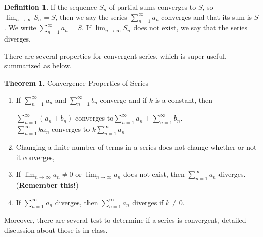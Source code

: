 \documentclass[12pt]{article}
\theoremstyle{definition}
\newtheorem{thm}{Theorem}[section]
\theoremstyle{definition}
\newtheorem{definition}{Definition}[section]
\theoremstyle{remark}
\theoremstyle{definition}
\theoremstyle{definition}
\theoremstyle{definition}
\begin{document}
\begin{definition}
If the sequence $S_n$ of partial sums converges to $S$, so $\lim_{n \to \infty}S_n = S$, then we say the series
$\sum_{n=1}^{\infty} a_n$ converges and that its sum is $S$. We write
$\sum_{n=1}^{\infty} a_n = S$. If $\lim_{n \to \infty}S_n$ does not exist, we
say that the series diverges.
\end{definition}

There are several properties for convergent series, which is super useful, summarized as below.
\begin{thm}
Convergence Properties of Series
\begin{enumerate}
\item If $\sum_{n=1}^{\infty} a_n$ and $\sum_{n=1}^{\infty} b_n$ converge and if $k$ is a constant, then

$\sum_{n=1}^{\infty} (a_n+b_n)$ converges to$\sum_{n=1}^{\infty} a_n + \sum_{n=1}^{\infty} b_n$.\\
$\sum_{n=1}^{\infty} ka_n$ converges to $k\sum_{n=1}^{\infty} a_n$

\item Changing a finite number of terms in a series does not change whether or not it converges,
\item  If $\lim_{n \to \infty}a_n\neq 0$ or $\lim_{n \to \infty}a_n$ does not exist, then
$\sum_{n=1}^{\infty} a_n$ diverges. (\textbf{Remember this!})
\item If $\sum_{n=1}^{\infty} a_n$ diverges, then $\sum_{n=1}^{\infty} a_n$ diverges if $k\neq 0$.
\end{enumerate}
\end{thm}
\pagebreak
Moreover, there are several test to determine if a series is convergent, detailed discussion about those is in class.
\end{document}
